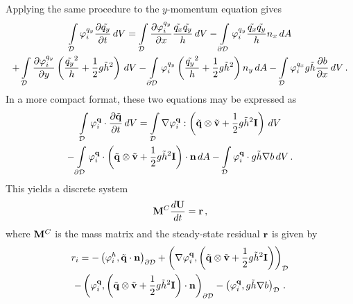 Applying the same procedure to the $y$-momentum equation gives
\begin{multline}
  \int\limits_{\mathcal{D}} \varphi_i^{q_y}\frac{\partial \tilde{q_y}}{\partial t} \,dV
  =
    \int\limits_{\mathcal{D}} \frac{\partial \varphi_i^{q_y}}{\partial x}
      \frac{\tilde{q_x}\tilde{q_y}}{h} \,dV
  - \int\limits_{\partial\mathcal{D}} \varphi_i^{q_y}
      \frac{\tilde{q_x}\tilde{q_y}}{h}n_x \,dA
  \\
  + \int\limits_{\mathcal{D}} \frac{\partial \varphi_i^{q_y}}{\partial y}
      \left(\frac{\tilde{q_y}^2}{h}
      + \frac{1}{2}g\tilde{h}^2\right) \,dV
  - \int\limits_{\partial\mathcal{D}} \varphi_i^{q_y}
      \left(\frac{\tilde{q_y}^2}{h}
      + \frac{1}{2}g\tilde{h}^2\right)n_y \,dA
  - \int\limits_{\mathcal{D}} \varphi_i^{q_x}
      g\tilde{h}\frac{\partial b}{\partial x} \,dV
  \,.
\end{multline}
In a more compact format, these two equations may be expressed as
\begin{multline}
  \int\limits_{\mathcal{D}} \varphi_i^{\mathbf{q}}\cdot\frac{\partial \tilde{\mathbf{q}}}{\partial t} \,dV
  = \int\limits_{\mathcal{D}} \nabla\varphi_i^{\mathbf{q}}:
    \left(\tilde{\mathbf{q}}\otimes\tilde{\mathbf{v}}
    + \frac{1}{2}g\tilde{h}^2\mathbf{I}\right) \,dV
  \\
  - \int\limits_{\partial\mathcal{D}} \varphi_i^{\mathbf{q}}\cdot
    \left(\tilde{\mathbf{q}}\otimes\tilde{\mathbf{v}}
    + \frac{1}{2}g \tilde{h}^2\mathbf{I}\right)\cdot\mathbf{n} \,dA
  - \int\limits_{\mathcal{D}} \varphi_i^{\mathbf{q}}\cdot
    g\tilde{h}\nabla b \,dV
  \,.
\end{multline}
This yields a discrete system
\begin{equation}
  \mathbf{M}^C\frac{d\mathbf{U}}{dt} = \mathbf{r} \,,
\end{equation}
where $\mathbf{M}^C$ is the mass matrix and the steady-state residual
$\mathbf{r}$ is given by
\begin{multline}
  r_i =
  - \left(\varphi_i^h,\tilde{\mathbf{q}}\cdot\mathbf{n}
    \right)_{\partial\mathcal{D}}
  + \left(\nabla\varphi_i^{\mathbf{q}},
    \left(\tilde{\mathbf{q}}\otimes\tilde{\mathbf{v}}
    + \frac{1}{2}g\tilde{h}^2\mathbf{I}\right)\right)_{\mathcal{D}}
  \\- \left(\varphi_i^{\mathbf{q}},
    \left(\tilde{\mathbf{q}}\otimes\tilde{\mathbf{v}}
    + \frac{1}{2}g \tilde{h}^2\mathbf{I}\right)\cdot\mathbf{n}
    \right)_{\partial\mathcal{D}}
  - \left(\varphi_i^{\mathbf{q}},
    g\tilde{h}\nabla b\right)_{\mathcal{D}} \,.
\end{multline}
